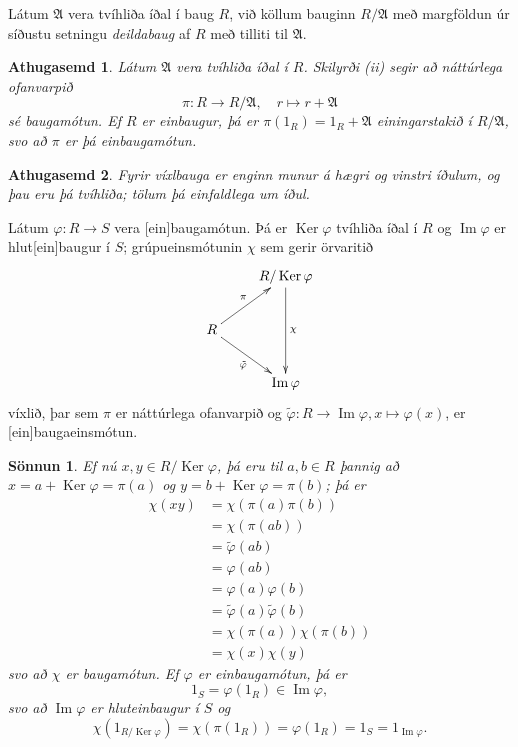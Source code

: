 \documentclass[a4paper,icelandic,11pt]{book}
\theoremstyle{plain}
\newtheorem*{ath}{Athugasemd}
\newtheorem*{sonnun}{Sönnun}
\DeclareMathOperator{\im}{Im} %
\DeclareMathOperator{\Ker}{Ker} %
\begin{document}
\begin{skilgr}
  Látum $\mathfrak A$ vera tvíhliða íðal í baug $R$, við köllum bauginn
  $R/\mathfrak A$ með margföldun úr síðustu setningu
  \emph{deildabaug} af
  $R$ með tilliti til $\mathfrak A$.
\end{skilgr}
\begin{ath}
  Látum $\mathfrak A$ vera tvíhliða íðal í $R$. Skilyrði (ii) segir að
  náttúrlega ofanvarpið\[
  \pi: R\to R/\mathfrak A,
  \quad
  r\mapsto r+\mathfrak A
  \]
  sé \emph{baugamótun}. Ef $R$ er einbaugur, þá er $\pi(1_R) = 1_R+\mathfrak A$
  \emph{einingarstakið} í $R/\mathfrak A$, svo að $\pi$ er þá
  \emph{einbaugamótun}.
\end{ath}
\begin{ath}
  Fyrir víxlbauga er enginn munur á hægri og vinstri íðulum, og þau eru þá
  tvíhliða; tölum þá einfaldlega um \emph{íðul}.
\end{ath}
\begin{setn}
  Látum $\varphi: R\to S$ vera [ein]baugamótun. Þá er $\Ker\varphi$ tvíhliða
  íðal í $R$ og $\im\varphi$ er hlut[ein]baugur í $S$; grúpueinsmótunin
  $\chi$ sem gerir örvaritið\[
  \xymatrix{
  & R/\Ker\varphi \ar[dd]^\chi 
  \\
  R \ar[ur]^\pi \ar[dr]_{\tilde\varphi} &
  \\
  & \im\varphi
  }
  \]
  víxlið, þar sem $\pi$ er náttúrlega ofanvarpið og $\tilde\varphi:
  R\to\im\varphi, x\mapsto \varphi(x)$, er [ein]baugaeinsmótun.
\end{setn}
\begin{sonnun}
  Ef nú $x,y\in R/\Ker\varphi$, þá eru til $a,b\in R$ þannig að $x =
  a+\Ker\varphi = \pi(a)$ og $y = b+\Ker\varphi = \pi(b)$; þá er
  \begin{align*}
    \chi(xy)
    &= \chi(\pi(a)\pi(b))
    \\
    &= \chi(\pi(ab))
    \\
    &= \tilde{\varphi}(ab)
    \\
    &= \varphi(ab)
    \\
    &= \varphi(a)\varphi(b)
    \\
    &= \tilde{\varphi}(a)\tilde{\varphi}(b)
    \\
    &= \chi(\pi(a))\chi(\pi(b))
    \\
    &= \chi(x)\chi(y)
  \end{align*}
  svo að $\chi$ er baugamótun. Ef $\varphi$ er einbaugamótun, þá er\[
  1_S = \varphi(1_R)\in\im\varphi,
  \]
  svo að $\im\varphi$ er hluteinbaugur í $S$ og\[
  \chi(1_{R/\Ker\varphi}) 
  = \chi(\pi(1_R))
  = \varphi(1_R)
  = 1_S
  = 1_{\im\varphi}.
  \]
\end{sonnun}
\end{document}

